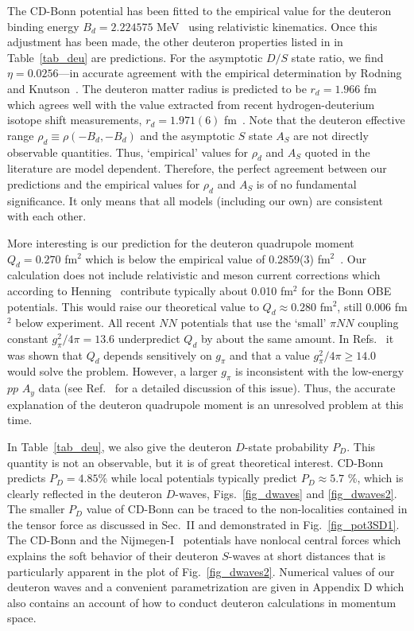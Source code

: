 The CD-Bonn potential has been fitted to the empirical value for the
deuteron binding energy $B_d = 2.224575$ MeV~\cite{LA82}
using relativistic kinematics. Once this adjustment has been
made, the other deuteron properties listed in in Table~\ref{tab_deu}
are predictions. For the asymptotic $D/S$ state ratio, we find
$\eta = 0.0256$---in accurate agreement with the empirical
determination by Rodning and Knutson~\cite{RK90}.
The deuteron matter radius is predicted to be $r_d = 1.966$ fm
which agrees well with the value extracted from recent 
hydrogen-deuterium isotope
shift measurements, $r_d = 1.971(6)$ fm~\cite{MSZ95}.
Note that the deuteron effective range $\rho_d \equiv \rho(-B_d,-B_d)$
and the asymptotic $S$ state $A_S$ are not directly observable quantities.
Thus, `empirical' values for $\rho_d$ and $A_S$
quoted in the literature are model dependent.
Therefore, the perfect agreement between our predictions
and the empirical values for $\rho_d$ and $A_S$
is of no fundamental significance.
It only means that all models (including our own) are consistent
with each other.

More interesting is our prediction for the deuteron quadrupole moment
$Q_d = 0.270$ fm$^2$ which is below
the empirical value of 0.2859(3) fm$^2$~\cite{BC79,ER83}.
Our calculation does not include relativistic and meson current corrections
which according to Henning~\cite{Hen93} contribute typically about 0.010 fm$^2$
for the Bonn OBE potentials. This would raise our theoretical
value to $Q_d \approx 0.280$ fm$^2$, still 0.006 fm$^2$ below
experiment. All recent $NN$ potentials that use the `small'
$\pi NN$ coupling constant $g^2_\pi/4\pi = 13.6$ underpredict $Q_d$
by about the same amount. In Refs.~\cite{MS91,Mac99} it was shown
that $Q_d$ depends sensitively on $g_\pi$ and that a value
$g^2_\pi/4\pi \geq 14.0$ would solve the problem.
However, a larger $g_\pi$ is inconsistent with the low-energy
$pp$ $A_y$ data (see Ref.~\cite{Mac99} for a detailed discussion of this issue).
Thus, the accurate explanation of the deuteron quadrupole moment
is an unresolved problem at this time.

In Table~\ref{tab_deu}, we also give the deuteron $D$-state
probability $P_D$. This quantity is not an observable, but it is
of great theoretical interest.
CD-Bonn predicts $P_D = 4.85$\% while local potentials typically
predict $P_D \approx 5.7$ \%, which is clearly reflected in the
deuteron $D$-waves,
Figs.~\ref{fig_dwaves} and \ref{fig_dwaves2}.
The smaller $P_D$ value of CD-Bonn can be traced to the non-localities
contained in the tensor force as discussed in Sec.~II 
and demonstrated in Fig.~\ref{fig_pot3SD1}. 
The CD-Bonn and the Nijmegen-I~\cite{Sto94} potentials have nonlocal
central forces which explains the soft behavior of their deuteron
$S$-waves at short distances that is particularly apparent
in the plot of Fig.~\ref{fig_dwaves2}.
Numerical values of our deuteron waves and a convenient
parametrization are given in Appendix D which also contains
an account of how to conduct deuteron calculations
in momentum space.


